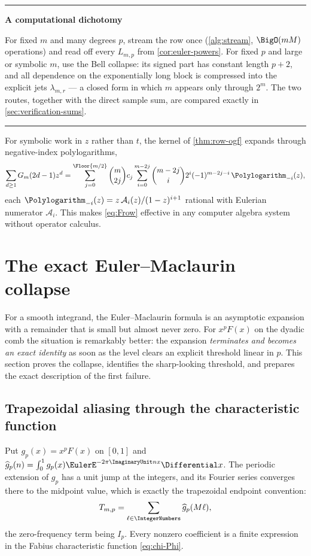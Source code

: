 \documentclass[11pt,oneside]{article}
\numberwithin{equation}{section}
\theoremstyle{definition}
\theoremstyle{remark}
\newenvironment{statusbox}[1]{%
  \par\smallskip\noindent\begin{center}\begin{minipage}{0.94\textwidth}%
  \hrule\vspace{0.5em}\noindent\textbf{#1}\par\smallskip
}{%
  \vspace{0.5em}\hrule\end{minipage}\end{center}\smallskip
}
\begin{document}
\begin{statusbox}{A computational dichotomy}
For fixed $m$ and many degrees $p$, stream the row once
(\cref{alg:stream}, $\BigO(mM)$ operations) and read off every
$L_{m,p}$ from \cref{cor:euler-powers}.  For fixed $p$ and large or
symbolic $m$, use the Bell collapse: its signed part has constant
length $p+2$, and all dependence on the exponentially long block is
compressed into the explicit jets $\lambda_{m,r}$ --- a closed form in
which $m$ appears only through $2^{m}$.  The two routes, together with
the direct sample sum, are compared exactly in
\cref{sec:verification-sums}.
\end{statusbox}

\begin{remark}
For symbolic work in $z$ rather than $t$, the kernel of
\cref{thm:row-ogf} expands through negative-index polylogarithms,
\begin{equation}
 \sum_{d\ge1}G_m(2d-1)z^{d}
 =\sum_{j=0}^{\Floor{m/2}}\binom m{2j}c_j
 \sum_{i=0}^{m-2j}\binom{m-2j}{i}2^{i}(-1)^{m-2j-i}\,
 \Polylogarithm_{-i}(z),
 \label{eq:B-polylog}
\end{equation}
each $\Polylogarithm_{-i}(z)=z\,\mathcal A_i(z)/(1-z)^{i+1}$ rational with
Eulerian numerator $\mathcal A_i$.  This makes
\eqref{eq:Frow} effective in any computer algebra system without
operator calculus.
\end{remark}

\section{The exact Euler--Maclaurin collapse}
\label{sec:em}

For a smooth integrand, the Euler--Maclaurin formula is an asymptotic
expansion with a remainder that is small but almost never zero.  For
$x^{p}F(x)$ on the dyadic comb the situation is remarkably better: the
expansion \emph{terminates and becomes an exact identity} as soon as
the level clears an explicit threshold linear in $p$.  This section
proves the collapse, identifies the sharp-looking threshold, and
prepares the exact description of the first failure.

\subsection{Trapezoidal aliasing through the characteristic function}

Put $g_p(x)=x^{p}F(x)$ on $[0,1]$ and
$\widehat g_p(n)=\int_0^1g_p(x)\EulerE^{-2\pi\ImaginaryUnit nx}\Differential x$.  The periodic
extension of $g_p$ has a unit jump at the integers, and its Fourier
series converges there to the midpoint value, which is exactly the
trapezoidal endpoint convention:
\begin{equation}
 T_{m,p}=\sum_{\ell\in\IntegerNumbers}\widehat g_p(M\ell),
 \label{eq:trap-alias}
\end{equation}
the zero-frequency term being $I_p$.  Every nonzero coefficient is a
finite expression in the Fabius characteristic function
\eqref{eq:chi-Phi}.
\end{document}
